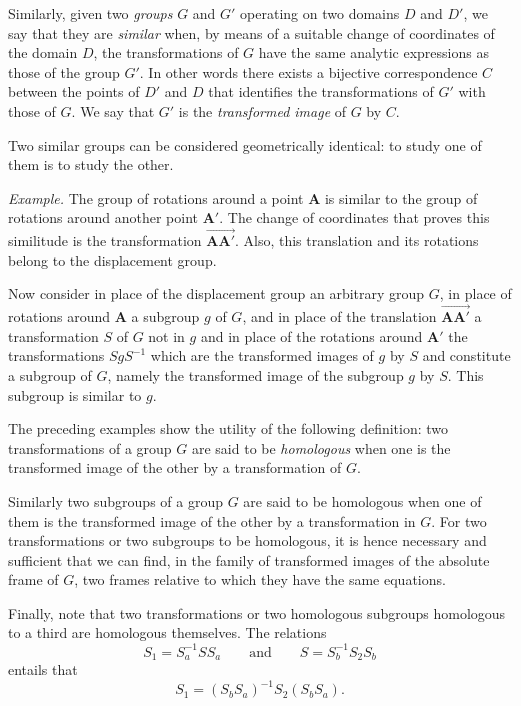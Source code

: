 \documentclass[leqno,11pt]{book}
\numberwithin{equation}{chapter}
\theoremstyle{shape1}
\theoremstyle{shapesmall}
\newcommand{\somespace}{\vspace{9pt}}
\begin{document}
\somespace

Similarly, given two \emph{groups} $G$ and $G'$ operating on two domains $D$ and $D'$, we say that they are \emph{similar} when, by means of a suitable change of coordinates of the domain $D$, the transformations of $G$ have the same analytic expressions as those of the group $G'$. In other words there exists a bijective correspondence $C$ between the points of $D'$ and $D$ that identifies the transformations of $G'$ with those of $G$. We say that $G'$ is the \emph{transformed image} of $G$ by $C$.

Two similar groups can be considered geometrically identical: to study one of them is to study the other.

\somespace

{\small
\emph{Example.} The group of rotations around a point $\mathbf{A}$ is similar to the group of rotations around another point $\mathbf{A}'$. The change of coordinates that proves this similitude is the transformation $\overrightarrow{\mathbf{AA}'}$. Also, this translation and its rotations belong to the displacement group.

Now consider in place of the displacement group an arbitrary group $G$, in place of rotations around $\mathbf{A}$ a subgroup $g$ of $G$, and in place of the translation $\overrightarrow{\mathbf{AA}'}$ a transformation $S$ of $G$ not in $g$ and in place of the rotations around $\mathbf{A}'$ the transformations $SgS^{-1}$ which are the transformed images of $g$ by $S$ and constitute a subgroup of $G$, namely the transformed image of the subgroup $g$ by $S$. This subgroup is similar to $g$.
}

\somespace

The preceding examples show the utility of the following definition: two transformations of a group $G$ are said to be \emph{homologous} when one is the transformed image of the other by a transformation of $G$.

Similarly two subgroups of a group $G$ are said to be homologous when one of them is the transformed image of the other by a transformation in $G$. For two transformations or two subgroups to be homologous, it is hence necessary and sufficient that we can find, in the family of transformed images of the absolute frame of $G$, two frames relative to which they have the same equations.

Finally, note that two transformations or two homologous subgroups homologous to a third are homologous themselves. The relations
\[
S_{1}=S_{a}^{-1}SS_{a}\qquad\text{and}\qquad S=S_{b}^{-1}S_{2}S_{b}
\]
entails that
\[
S_{1}=(S_{b}S_{a})^{-1}S_{2}(S_{b}S_{a}).
\]
\end{document}
